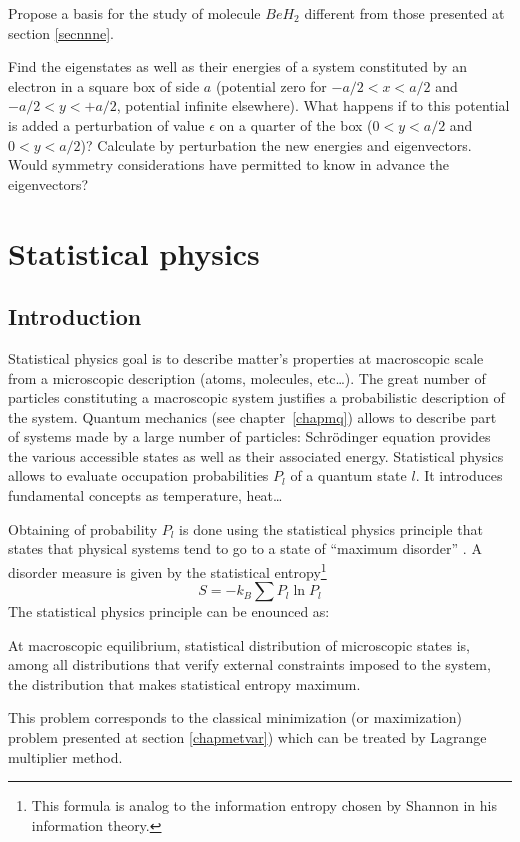 \documentclass[12pt]{book}
\begin{document}
\begin{exo}
Propose a basis for the study of molecule $BeH_{2}$ different from those
presented at section \ref{secnnne}.
\end{exo}
\begin{exo}
Find the eigenstates as well as their energies of a system constituted
by an electron in a square box
of side $a$ (potential zero for $-a/2<x<a/2$ and
$-a/2<y<+a/2$, potential infinite elsewhere). 
What happens if to this potential is added a perturbation of value $\epsilon$
on a quarter of the box
($0<y<a/2$ and $0<y<a/2$)?
Calculate by perturbation the new energies and eigenvectors. Would symmetry
considerations have permitted to know in advance the eigenvectors?
\end{exo}



\chapter{Statistical physics}\label{chapphysstat}
\section{Introduction}
Statistical physics goal is to describe matter's properties at macroscopic
scale from a microscopic description (atoms, molecules, etc\dots). The great
number of particles constituting a macroscopic system justifies a
probabilistic description of the system. Quantum mechanics (see
chapter~\ref{chapmq})  allows to describe part of systems made by a large
number of particles: Schr\"odinger equation provides the various accessible
states as well as their associated energy. Statistical physics allows to
evaluate occupation probabilities $P_l$ of a quantum state $l$. It introduces
fundamental concepts as temperature, heat\dots

Obtaining of probability $P_l$ is done using the statistical physics principle
that states that physical systems tend to go to  a state of ``maximum
disorder'' \cite{ph:physt:Reif64,ph:physt:Diu89}. A disorder measure is given
by the statistical entropy\footnote{%
This formula is analog to the information entropy chosen by Shannon in his
information theory\cite{ph:physt:Shannon49}.}
\begin{equation}
S=-k_B\sum P_l \ln P_l
\end{equation}
The statistical physics principle can be enounced as:
\begin{postulat}
At macroscopic equilibrium, statistical distribution of microscopic states is,
among all distributions that verify external constraints imposed to the
system, the distribution that makes statistical entropy maximum.
\end{postulat}
\begin{rem}
This problem corresponds to the classical minimization (or maximization)
problem presented at 
section \ref{chapmetvar}) which can be treated by Lagrange multiplier method.
\end{rem}
\end{document}
